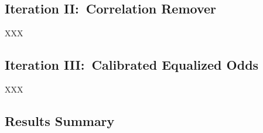 \subsection{Iteration II:\ Correlation Remover}\label{subsec:Iteration_II}

XXX

\subsection{Iteration III:\ Calibrated Equalized Odds}\label{subsec:Iteration_III}

XXX

\subsection{Results Summary}\label{subsec:Results_Summary}

